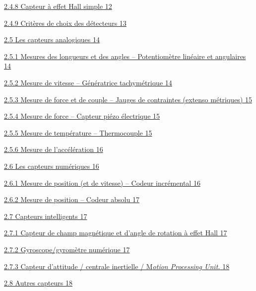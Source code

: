 \documentclass[
]{article}
\begin{document}
\protect\hyperlink{capteur-uxe0-effet-hall-simple}{2.4.8 Capteur à effet
Hall simple 12}

\protect\hyperlink{crituxe8res-de-choix-des-duxe9tecteurs}{2.4.9
Critères de choix des détecteurs 13}

\protect\hyperlink{les-capteurs-analogiques}{2.5 Les capteurs
analogiques 14}

\protect\hyperlink{mesures-des-longueurs-et-des-angles-potentiomuxe8tre-linuxe9aire-et-angulaires}{2.5.1
Mesures des longueurs et des angles -- Potentiomètre linéaire et
angulaires 14}

\protect\hyperlink{mesure-de-vitesse-guxe9nuxe9ratrice-tachymuxe9trique}{2.5.2
Mesure de vitesse -- Génératrice tachymétrique 14}

\protect\hyperlink{mesure-de-force-et-de-couple-jauges-de-contraintes-extenso-muxe9triques}{2.5.3
Mesure de force et de couple -- Jauges de contraintes (extenso
métriques) 15}

\protect\hyperlink{mesure-de-force-capteur-piuxe9zo-uxe9lectrique}{2.5.4
Mesure de force -- Capteur piézo électrique 15}

\protect\hyperlink{mesure-de-tempuxe9rature-thermocouple}{2.5.5 Mesure
de température -- Thermocouple 15}

\protect\hyperlink{mesure-de-laccuxe9luxe9ration}{2.5.6 Mesure de
l'accélération 16}

\protect\hyperlink{les-capteurs-numuxe9riques}{2.6 Les capteurs
numériques 16}

\protect\hyperlink{mesure-de-position-et-de-vitesse-codeur-incruxe9mental}{2.6.1
Mesure de position (et de vitesse) -- Codeur incrémental 16}

\protect\hyperlink{mesure-de-position-codeur-absolu}{2.6.2 Mesure de
position -- Codeur absolu 17}

\protect\hyperlink{capteurs-intelligents}{2.7 Capteurs intelligents 17}

\protect\hyperlink{capteur-de-champ-magnuxe9tique-et-dangle-de-rotation-uxe0-effet-hall}{2.7.1
Capteur de champ magnétique et d'angle de rotation à effet Hall 17}

\protect\hyperlink{gyroscopegyromuxe8tre-numuxe9rique}{2.7.2
Gyroscope/gyromètre numérique 17}

\protect\hyperlink{capteur-dattitude-centrale-inertielle-motion-processing-unit.}{2.7.3
Capteur d'attitude / centrale inertielle / M\emph{otion Processing
Unit.} 18}

\protect\hyperlink{autres-capteurs}{2.8 Autres capteurs 18}
\end{document}
